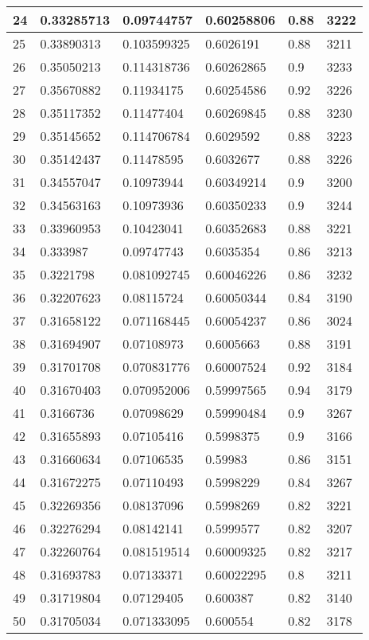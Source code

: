 \begin{longtable}{|l|l|l|l|l|l|}
24 & 0.33285713 & 0.09744757 & 0.60258806 & 0.88 & 3222 \\ \hline 
25 & 0.33890313 & 0.103599325 & 0.6026191 & 0.88 & 3211 \\ \hline 
26 & 0.35050213 & 0.114318736 & 0.60262865 & 0.9 & 3233 \\ \hline 
27 & 0.35670882 & 0.11934175 & 0.60254586 & 0.92 & 3226 \\ \hline 
28 & 0.35117352 & 0.11477404 & 0.60269845 & 0.88 & 3230 \\ \hline 
29 & 0.35145652 & 0.114706784 & 0.6029592 & 0.88 & 3223 \\ \hline 
30 & 0.35142437 & 0.11478595 & 0.6032677 & 0.88 & 3226 \\ \hline 
31 & 0.34557047 & 0.10973944 & 0.60349214 & 0.9 & 3200 \\ \hline 
32 & 0.34563163 & 0.10973936 & 0.60350233 & 0.9 & 3244 \\ \hline 
33 & 0.33960953 & 0.10423041 & 0.60352683 & 0.88 & 3221 \\ \hline 
34 & 0.333987 & 0.09747743 & 0.6035354 & 0.86 & 3213 \\ \hline 
35 & 0.3221798 & 0.081092745 & 0.60046226 & 0.86 & 3232 \\ \hline 
36 & 0.32207623 & 0.08115724 & 0.60050344 & 0.84 & 3190 \\ \hline 
37 & 0.31658122 & 0.071168445 & 0.60054237 & 0.86 & 3024 \\ \hline 
38 & 0.31694907 & 0.07108973 & 0.6005663 & 0.88 & 3191 \\ \hline 
39 & 0.31701708 & 0.070831776 & 0.60007524 & 0.92 & 3184 \\ \hline 
40 & 0.31670403 & 0.070952006 & 0.59997565 & 0.94 & 3179 \\ \hline 
41 & 0.3166736 & 0.07098629 & 0.59990484 & 0.9 & 3267 \\ \hline 
42 & 0.31655893 & 0.07105416 & 0.5998375 & 0.9 & 3166 \\ \hline 
43 & 0.31660634 & 0.07106535 & 0.59983 & 0.86 & 3151 \\ \hline 
44 & 0.31672275 & 0.07110493 & 0.5998229 & 0.84 & 3267 \\ \hline 
45 & 0.32269356 & 0.08137096 & 0.5998269 & 0.82 & 3221 \\ \hline 
46 & 0.32276294 & 0.08142141 & 0.5999577 & 0.82 & 3207 \\ \hline 
47 & 0.32260764 & 0.081519514 & 0.60009325 & 0.82 & 3217 \\ \hline 
48 & 0.31693783 & 0.07133371 & 0.60022295 & 0.8 & 3211 \\ \hline 
49 & 0.31719804 & 0.07129405 & 0.600387 & 0.82 & 3140 \\ \hline 
50 & 0.31705034 & 0.071333095 & 0.600554 & 0.82 & 3178 \\ \hline 
\end{longtable}